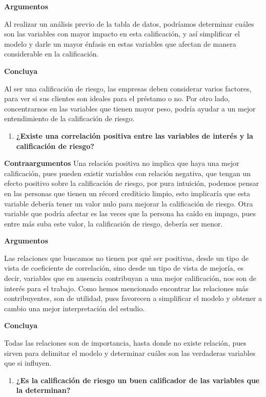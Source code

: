 \documentclass[
  letterpaper,
  DIV=11,
  numbers=noendperiod]{scrreprt}
\providecommand{\tightlist}{%
  \setlength{\itemsep}{0pt}\setlength{\parskip}{0pt}}\usepackage{longtable,booktabs,array}
\begin{document}
\textbf{Argumentos}

Al realizar un análisis previo de la tabla de datos, podríamos
determinar cuáles son las variables con mayor impacto en esta
calificación, y así simplificar el modelo y darle un mayor énfasis en
estas variables que afectan de manera considerable en la calificación.

\textbf{Concluya}

Al ser una calificación de riesgo, las empresas deben considerar varios
factores, para ver si sus clientes son ideales para el préstamo o no.
Por otro lado, concentrarnos en las variables que tienen mayor peso,
podría ayudar a un mejor entendimiento de la calificación de riesgo.

\begin{enumerate}
\def\labelenumi{\arabic{enumi}.}
\setcounter{enumi}{1}
\tightlist
\item
  \textbf{¿Existe una correlación positiva entre las variables de
  interés y la calificación de riesgo?}
\end{enumerate}

\textbf{Contraargumentos} Una relación positiva no implica que haya una
mejor calificación, pues pueden existir variables con relación negativa,
que tengan un efecto positivo sobre la calificación de riesgo, por pura
intuición, podemos pensar en las personas que tienen un récord
crediticio limpio, esto implicaría que esta variable debería tener un
valor nulo para mejorar la calificación de riesgo. Otra variable que
podría afectar es las veces que la persona ha caído en impago, pues
entre más suba este valor, la calificación de riesgo, debería ser menor.

\textbf{Argumentos}

Las relaciones que buscamos no tienen por qué ser positivas, desde un
tipo de vista de coeficiente de correlación, sino desde un tipo de vista
de mejoría, es decir, variables que en ausencia contribuyan a una mejor
calificación, nos son de interés para el trabajo. Como hemos mencionado
encontrar las relaciones más contribuyentes, son de utilidad, pues
favorecen a simplificar el modelo y obtener a cambio una mejor
interpretación del estudio.

\textbf{Concluya}

Todas las relaciones son de importancia, hasta donde no existe relación,
pues sirven para delimitar el modelo y determinar cuáles son las
verdaderas variables que si influyen.

\begin{enumerate}
\def\labelenumi{\arabic{enumi}.}
\setcounter{enumi}{2}
\tightlist
\item
  \textbf{¿Es la calificación de riesgo un buen calificador de las
  variables que la determinan?}
\end{enumerate}
\end{document}
